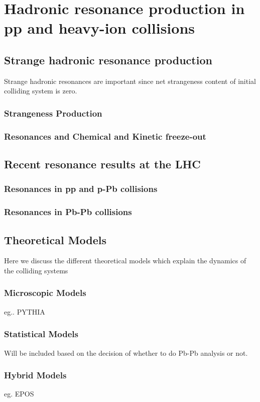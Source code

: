 \chapter{Hadronic resonance production in pp and heavy-ion collisions}
\label{cap:2}


\vspace*{2cm}


\section{Strange hadronic resonance production}
\label{par:2.1}
Strange hadronic resonances are important since net strangeness content of initial colliding system is zero.

\subsection{Strangeness Production}
\label{par:2.1a}

\subsection{Resonances and Chemical and Kinetic freeze-out}
\label{par:2.1b}


\section{Recent resonance results at the LHC}
\label{par:2.2}

\subsection{Resonances in pp and p-Pb collisions}
\label{par:2.2a}

\subsection{Resonances in Pb-Pb collisions}
\label{par:2.2b}



\section{Theoretical Models}
\label{par:2.3}
Here we discuss the different theoretical models which explain the dynamics of the colliding systems


\subsection{Microscopic Models}
\label{par:2.3a}
eg.. PYTHIA

\subsection{Statistical Models}
\label{par:2.3b}
Will be included based on the decision of whether to do Pb-Pb analysis or not.

\subsection{Hybrid Models}
\label{par:2.3c}
eg. EPOS













